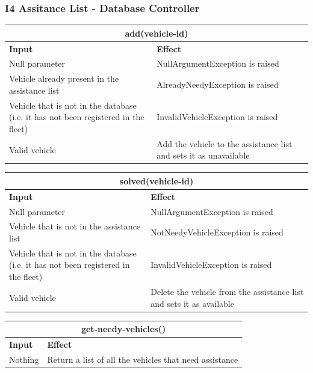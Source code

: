 \documentclass{article}
\begin{document}
\subsubsection{I4 Assitance List - Database Controller}
\begin{tabular}{ |p{5cm}|p{7cm}| }
  \hline
  \multicolumn{2}{|c|}{add(vehicle-id)} \\
  \hline
  \textbf{Input} & \textbf{Effect} \\
  \hline
  Null parameter & NullArgumentException is raised\\
  \hline
  Vehicle already present in the assistance list & AlreadyNeedyException is raised\\
  \hline
  Vehicle that is not in the database (i.e. it has not been registered in the fleet) & InvalidVehicleException is raised\\
  \hline
  Valid vehicle & Add the vehicle to the assistance list and sets it as unavailable\\
  \hline
\end{tabular}
\newline
\begin{tabular}{ |p{5cm}|p{7cm}| }
  \hline
  \multicolumn{2}{|c|}{solved(vehicle-id)} \\
  \hline
  \textbf{Input} & \textbf{Effect} \\
  \hline
  Null parameter & NullArgumentException is raised\\
  \hline
  Vehicle that is not in the assistance list & NotNeedyVehicleException is raised\\
  \hline
  Vehicle that is not in the database (i.e. it has not been registered in the fleet) & InvalidVehicleException is raised\\
  \hline
  Valid vehicle & Delete the vehicle from the assistance list and sets it as available\\
  \hline
\end{tabular}
\newline
\begin{tabular}{ |p{5cm}|p{7cm}| }
  \hline
  \multicolumn{2}{|c|}{get-needy-vehicles()} \\
  \hline
  \textbf{Input} & \textbf{Effect} \\
  \hline
  Nothing & Return a list of all the vehicles that need assistance\\
  \hline
\end{tabular}
\end{document}
